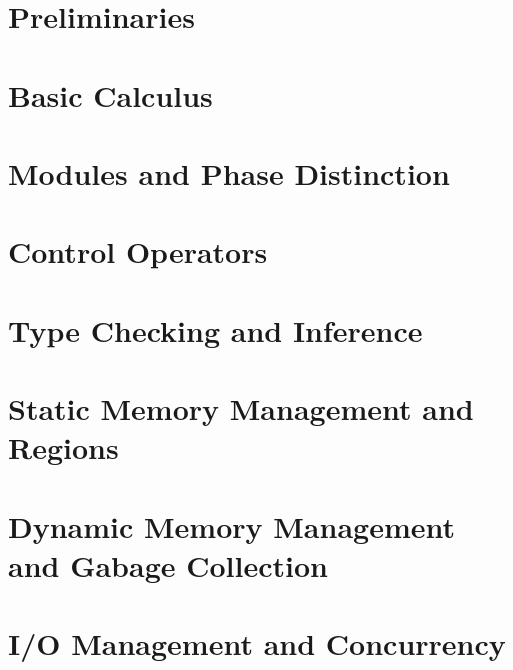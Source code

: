 \documentclass[
  dvipdfmx,
  uplatex,
  japanese,
  titlepage
]{jsbook}
\begin{document}
\maketitle
\thispagestyle{empty}

\thispagestyle{empty}


\tableofcontents
\clearpage

\chapter{Preliminaries}


\chapter{Basic Calculus}










\chapter{Modules and Phase Distinction}


\chapter{Control Operators}

\chapter{Type Checking and Inference}

\chapter{Static Memory Management and Regions}

\chapter{Dynamic Memory Management and Gabage Collection}

\chapter{I/O Management and Concurrency}
\end{document}
